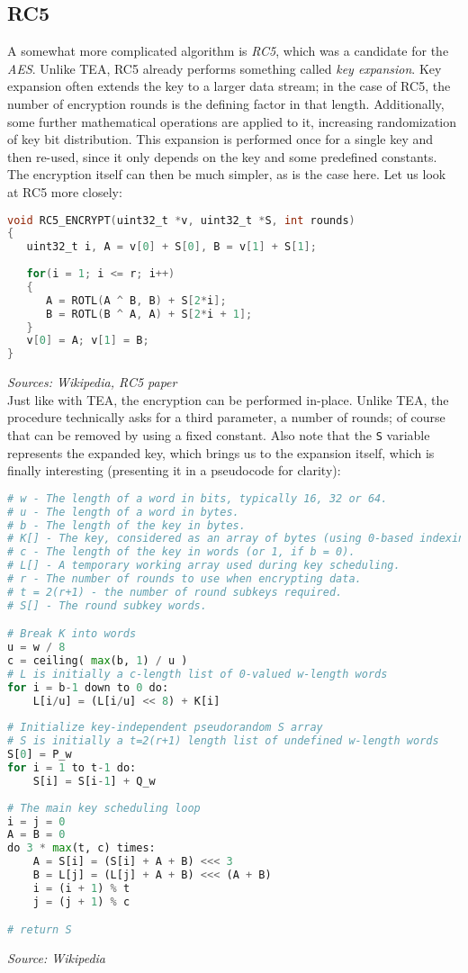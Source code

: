 \documentclass[a4paper,10pt,openright]{memoir}
\newcommand{\term}[1]{\textit{#1}}
\newcommand{\code}[1]{\texttt{#1}}
\begin{document}
\subsection{RC5}

A somewhat more complicated algorithm is \term{RC5}, which was a 
candidate for the \term{AES}. Unlike TEA, RC5 already performs 
something called \term{key expansion}. Key expansion often extends the 
key to a larger data stream; in the case of RC5, the number of 
encryption rounds is the defining factor in that length. Additionally, 
some further mathematical operations are applied to it, increasing 
randomization of key bit distribution. This expansion is performed once 
for a single key and then re-used, since it only depends on the key and 
some predefined constants. The encryption itself can then be much 
simpler, as is the case here. Let us look at RC5 more closely:

\begin{lstlisting}[language=C]
void RC5_ENCRYPT(uint32_t *v, uint32_t *S, int rounds)
{
   uint32_t i, A = v[0] + S[0], B = v[1] + S[1];
   
   for(i = 1; i <= r; i++)
   {
      A = ROTL(A ^ B, B) + S[2*i];
      B = ROTL(B ^ A, A) + S[2*i + 1];
   }
   v[0] = A; v[1] = B;
}
\end{lstlisting}
\textit{\footnotesize Sources: Wikipedia, RC5 paper}\\

Just like with TEA, the encryption can be performed in-place. Unlike 
TEA, the procedure technically asks for a third parameter, a number of 
rounds; of course that can be removed by using a fixed constant. Also 
note that the \code{S} variable represents the expanded key, which 
brings us to the expansion itself, which is finally interesting 
(presenting it in a pseudocode for clarity):

\begin{lstlisting}[language=Python]
# w - The length of a word in bits, typically 16, 32 or 64.
# u - The length of a word in bytes.
# b - The length of the key in bytes.
# K[] - The key, considered as an array of bytes (using 0-based indexing).
# c - The length of the key in words (or 1, if b = 0).
# L[] - A temporary working array used during key scheduling.
# r - The number of rounds to use when encrypting data.
# t = 2(r+1) - the number of round subkeys required.
# S[] - The round subkey words.

# Break K into words
u = w / 8
c = ceiling( max(b, 1) / u )
# L is initially a c-length list of 0-valued w-length words
for i = b-1 down to 0 do:
    L[i/u] = (L[i/u] << 8) + K[i]
     
# Initialize key-independent pseudorandom S array
# S is initially a t=2(r+1) length list of undefined w-length words
S[0] = P_w
for i = 1 to t-1 do:
    S[i] = S[i-1] + Q_w
    
# The main key scheduling loop
i = j = 0
A = B = 0
do 3 * max(t, c) times:
    A = S[i] = (S[i] + A + B) <<< 3
    B = L[j] = (L[j] + A + B) <<< (A + B)
    i = (i + 1) % t
    j = (j + 1) % c

# return S
\end{lstlisting}
\textit{\footnotesize Source: Wikipedia}\\
\end{document}
